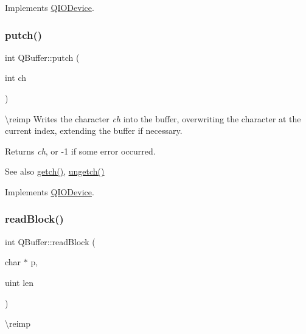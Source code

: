 Implements \mbox{\hyperlink{class_q_i_o_device_ae4046ae7bf4d4cee1010239973314e42}{Q\+I\+O\+Device}}.

\mbox{\label{class_q_buffer_aa05ca49f73284ac1fa2b01ffb3be2874}} 
\subsubsection{\texorpdfstring{putch()}{putch()}}
{\footnotesize\ttfamily int Q\+Buffer\+::putch (\begin{DoxyParamCaption}\item[{int}]{ch }\end{DoxyParamCaption})\hspace{0.3cm}{\ttfamily [virtual]}}

\textbackslash{}reimp Writes the character {\itshape ch} into the buffer, overwriting the character at the current index, extending the buffer if necessary.

Returns {\itshape ch}, or -\/1 if some error occurred.

\begin{DoxySeeAlso}{See also}
\mbox{\hyperlink{class_q_buffer_abec634737e1d5a9b314e822737e51992}{getch()}}, \mbox{\hyperlink{class_q_buffer_a52f9ebc674d0651e6fd89e148529bb50}{ungetch()}} 
\end{DoxySeeAlso}


Implements \mbox{\hyperlink{class_q_i_o_device_a5de5c1c1cba7ca36ba93289e30cd3029}{Q\+I\+O\+Device}}.

\mbox{\label{class_q_buffer_a7deacf4bbd599f075f3dad4b20cafeb0}} 
\subsubsection{\texorpdfstring{readBlock()}{readBlock()}}
{\footnotesize\ttfamily int Q\+Buffer\+::read\+Block (\begin{DoxyParamCaption}\item[{char $\ast$}]{p,  }\item[{uint}]{len }\end{DoxyParamCaption})\hspace{0.3cm}{\ttfamily [virtual]}}

\textbackslash{}reimp 

